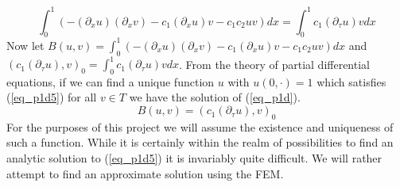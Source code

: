 \documentclass[11pt,fleqn]{article}
\theoremstyle{defstyle}
\begin{document}
\begin{equation}
\int_0^1 (-(\partial_xu)(\partial_xv) - c_1(\partial_xu)v - c_1c_2uv)dx = \int^1_0 c_1(\partial_{\tau}u)v dx
\label{eq_p1d4}
\end{equation}
Now let $B(u, v) = \int_0^1 (-(\partial_xu)(\partial_xv) - c_1(\partial_xu)v - c_1c_2uv)dx$ and $(c_1(\partial_{\tau}u),v)_0 = \int^1_0 c_1(\partial_{\tau}u)v dx$. From the theory of partial differential equations, if we can find a unique function $u$ with $u(0, \cdot)=1$ which satisfies (\ref{eq_p1d5}) for all $v \in T$ we have the solution of (\ref{eq_p1d}).
\begin{equation}
B(u, v) = (c_1(\partial_{\tau}u),v)_0
\label{eq_p1d5}
\end{equation}
For the purposes of this project we will assume the existence and uniqueness of such a function. While it is certainly within the realm of possibilities to find an analytic solution to (\ref{eq_p1d5}) it is invariably quite difficult. We will rather attempt to find an approximate solution using the FEM.
\end{document}

